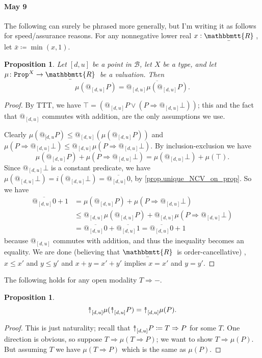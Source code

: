 \documentclass[11pt, oneside, article]{memoir}
\makeatletter
\theoremstyle{plain}
\newtheorem{proposition}[theorem]{Proposition}
\theoremstyle{definition}
\theoremstyle{remark}
\newcommand{\const}[1]{\mathtt{#1}}
\newcommand{\ol}[1]{\overline{#1}}
\newcommand{\ubar}[1]{\underaccent{\bar}{#1}}
\newcommand{\internal}[1]{\raisebox{-.03ex}{$\mathbbmtt{#1}$}}
\newcommand{\hs}{\hspace{1.1pt}}
\newcommand{\tRR}{\internal{R}\hs}
\newcommand{\tLR}{\ubar{\tRR}\hs}
\newcommand{\Prop}{\const{Prop}}
\newcommand{\BaseTopos}{\mathcal{B}}
\newcommand{\AtSymbol}{{@}}
\newcommand{\InSymbol}{{\upclose}}%
\newcommand{\At}[2][]{\AtSymbol^{#1}_{#2}}
\newcommand{\In}[2][]{\InSymbol^{#1}_{#2}}
\newcommand{\upclose}{{\rotatebox[origin=c]{90}{$\twoheadrightarrow$}}}
\newcommand{\imp}{\Rightarrow}
\makeatother
\begin{document}
\paragraph{May 9}

The following can surely be phrased more generally, but I'm writing it as follows for speed/assurance reasons. For any nonnegative lower real $x:\tLR$, let $\bar{x}\coloneqq\min(x,1)$.

\begin{proposition}
Let $[d,u]$ be a point in $\BaseTopos$, let $X$ be a type, and let $\mu\colon\Prop^X\to\tLR$ be a valuation. Then
\[\mu(\At{[d,u]}P)=\ol{\At{[d,u]}\mu(\At{[d,u]}P)}.\]
\end{proposition}
\begin{proof}
By TTT, we have $\top=(\At{[d,u]}P\vee(P\imp\At{[d,u]}\bot))$; this and the fact that $\At{[d,u]}$ commutes with addition, are the only assumptions we use.

Clearly $\mu(\At{[d,u}P)\leq\At{[d,u]}(\mu(\At{[d,u]}P))$ and $\mu(P\imp\At{[d,u]}\bot)\leq\At{[d,u]}\mu(P\imp\At{[d,u]}\bot)$. By inclusion-exclusion we have
\[\mu(\At{[d,u]}P)+\mu(P\imp\At{[d,u]}\bot)=\mu(\At{[d,u]}\bot)+\mu(\top).\]
Since $\At{[d,u]}\bot$ is a constant predicate, we have $\mu(\At{[d,u]}\bot)=i(\At{[d,u]}\bot)=\ol{\At{[d,u]}0}$, by \cref{prop.unique_NCV_on_prop}. So we have 
\begin{align*}
	\ol{\At{[d,u]}0}+1
	&=\mu(\At{[d,u]}P)+\mu(P\imp\At{[d,u]}\bot)\\
	&\leq\At{[d,u]}\mu(\At{[d,u]}P)+\At{[d,u]}\mu(P\imp\At{[d,u]}\bot)\\
	&=\ol{\At{[d,u]}0}+\ol{\At{[d,u]}1}=\ol{\At{[d,u]}0}+1
\end{align*}
because $\At{[d,u]}$ commutes with addition, and thus the inequality becomes an equality. We are done (believing that $\tLR$ is order-cancellative) , $x\leq x'$ and $y\leq y'$ and $x+y=x'+y'$ implies $x=x'$ and $y=y'$.
\end{proof}

The following holds for any open modality $T\imp-$.
\begin{proposition}\label{prop.In_NCV}
\[\In{[d,u]}\mu(\In{[d,u]}P)=\In{[d,u]}\mu(P).\]
\end{proposition}
\begin{proof}
This is just naturality; recall that $\In{[d,u]}P\coloneqq T\imp P$ for some $T$. One direction is obvious, so suppose $T\imp\mu(T\imp P)$; we want to show $T\imp\mu(P)$. But assuming $T$ we have $\mu(T\imp P)$ which is the same as $\mu(P)$.
\end{proof}
\end{document}
